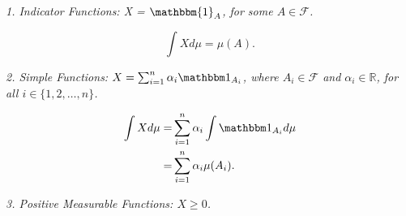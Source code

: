 \documentclass[10pt, oneside]{article}
\newcommand{\R}{\mathbb{R}}
\begin{document}
\emph{1. Indicator Functions:  X = $\mathbbm{1}_A$, for some $A \in \mathcal{F}$. }

\[\int{X d\mu} = \mu(A). \]

\emph{2. Simple Functions: $X = \sum_{i=1}^{n}\alpha_{i}\ind_{A_{i}}$, where $A_{i} \in \mathcal{F}$
and $\alpha_{i} \in \R$, for all $i \in \{1,2,\dots,n\}$.} 

\begin{align*}
    \int{X d\mu} = & \sum_{i=1}^{n}\alpha_{i} \int{\ind_{A_{i}} d\mu} \\
                 = & \sum_{i=1}^{n}\alpha_{i} \mu(A_{i}). 
\end{align*}

\emph{3. Positive Measurable Functions: $X \geq 0$. }


\clearpage
\end{document}
